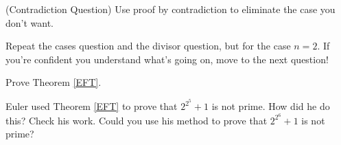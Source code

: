 \documentclass[handout,nooutcomes]{ximera}
\begin{document}
\begin{question}
(Contradiction Question) Use proof by contradiction to eliminate the case you don't want.
\end{question}

\begin{question}
Repeat the cases question and the divisor question, but for the case $n=2$.  If you're 
confident you understand what's going on, move to the next question!
\end{question}

\begin{question}
Prove Theorem \ref{EFT}.
\end{question}

\begin{question}
Euler used Theorem \ref{EFT} to prove that $2^{2^5}+1$ is not prime.  How did he do this?  
Check his work.  Could you use his method to prove that $2^{2^6} +1$ is not prime?
\end{question}
\end{document}
